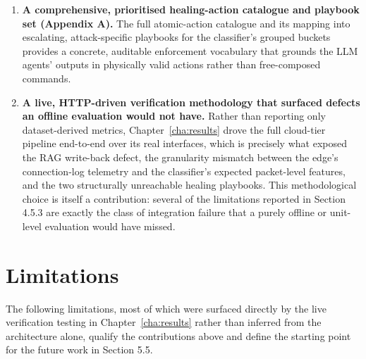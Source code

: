 \begin{enumerate}
\item \textbf{A comprehensive, prioritised healing-action catalogue and playbook set (Appendix A).} The full atomic-action catalogue and its mapping into escalating, attack-specific playbooks for the classifier's grouped buckets provides a concrete, auditable enforcement vocabulary that grounds the LLM agents' outputs in physically valid actions rather than free-composed commands.

\item \textbf{A live, HTTP-driven verification methodology that surfaced defects an offline evaluation would not have.} Rather than reporting only dataset-derived metrics, Chapter~\ref{cha:results} drove the full cloud-tier pipeline end-to-end over its real interfaces, which is precisely what exposed the RAG write-back defect, the granularity mismatch between the edge's connection-log telemetry and the classifier's expected packet-level features, and the two structurally unreachable healing playbooks. This methodological choice is itself a contribution: several of the limitations reported in Section 4.5.3 are exactly the class of integration failure that a purely offline or unit-level evaluation would have missed.
\end{enumerate}

\section{Limitations}

The following limitations, most of which were surfaced directly by the live verification testing in Chapter~\ref{cha:results} rather than inferred from the architecture alone, qualify the contributions above and define the starting point for the future work in Section 5.5.

